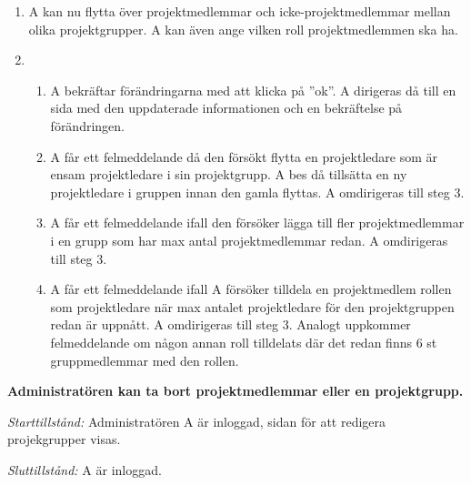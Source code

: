 \documentclass[a4paper]{article}
\begin{document}
\begin{ST}
\begin{enumerate}
\item A kan nu flytta över projektmedlemmar och icke-projektmedlemmar mellan olika projektgrupper. A kan även ange vilken roll projektmedlemmen ska ha.
\item 
\begin{enumerate}
\item A bekräftar förändringarna med att klicka på ''ok''. A dirigeras då till en sida med den uppdaterade informationen och en bekräftelse på förändringen.
\item A får ett felmeddelande då den försökt flytta en projektledare som är ensam projektledare i sin projektgrupp. A bes då tillsätta en ny projektledare i gruppen innan den gamla flyttas. A omdirigeras till steg 3.
\item A får ett felmeddelande ifall den försöker lägga till fler projektmedlemmar i en grupp som har max antal projektmedlemmar redan. A omdirigeras till steg 3.
\item A får ett felmeddelande ifall A försöker tilldela en projektmedlem rollen som projektledare när max antalet projektledare för den projektgruppen redan är uppnått. A omdirigeras till steg 3. Analogt uppkommer felmeddelande om någon annan roll tilldelats där det redan finns 6 st gruppmedlemmar med den rollen.
\end{enumerate}
\end{enumerate}

\item
\textbf{Administratören kan ta bort projektmedlemmar eller en projektgrupp.}

\emph{Starttillstånd:} Administratören A är inloggad, sidan för att redigera projekgrupper visas.

\emph{Sluttillstånd:} A är inloggad.


\end{ST}
\end{document}
